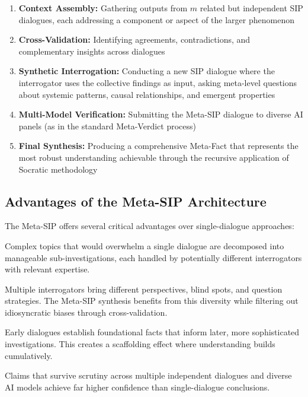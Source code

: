 \documentclass[11pt,a4paper]{article}
\begin{document}
\begin{small}
\begin{enumerate}[leftmargin=*]
    \item \textbf{Context Assembly:} Gathering outputs from $m$ related but independent SIP dialogues, each addressing a component or aspect of the larger phenomenon
    \item \textbf{Cross-Validation:} Identifying agreements, contradictions, and complementary insights across dialogues
    \item \textbf{Synthetic Interrogation:} Conducting a new SIP dialogue where the interrogator uses the collective findings as input, asking meta-level questions about systemic patterns, causal relationships, and emergent properties
    \item \textbf{Multi-Model Verification:} Submitting the Meta-SIP dialogue to diverse AI panels (as in the standard Meta-Verdict process)
    \item \textbf{Final Synthesis:} Producing a comprehensive Meta-Fact that represents the most robust understanding achievable through the recursive application of Socratic methodology
\end{enumerate}

\subsection{Advantages of the Meta-SIP Architecture}

The Meta-SIP offers several critical advantages over single-dialogue approaches:

\begin{description}[style=nextline]
\item[\textbf{Distributed Cognitive Load:}] Complex topics that would overwhelm a single dialogue are decomposed into manageable sub-investigations, each handled by potentially different interrogators with relevant expertise.

\item[\textbf{Bias Diversification:}] Multiple interrogators bring different perspectives, blind spots, and question strategies. The Meta-SIP synthesis benefits from this diversity while filtering out idiosyncratic biases through cross-validation.

\item[\textbf{Iterative Depth:}] Early dialogues establish foundational facts that inform later, more sophisticated investigations. This creates a scaffolding effect where understanding builds cumulatively.

\item[\textbf{Falsification Robustness:}] Claims that survive scrutiny across multiple independent dialogues and diverse AI models achieve far higher confidence than single-dialogue conclusions.


\end{description}
\end{small}
\end{document}
